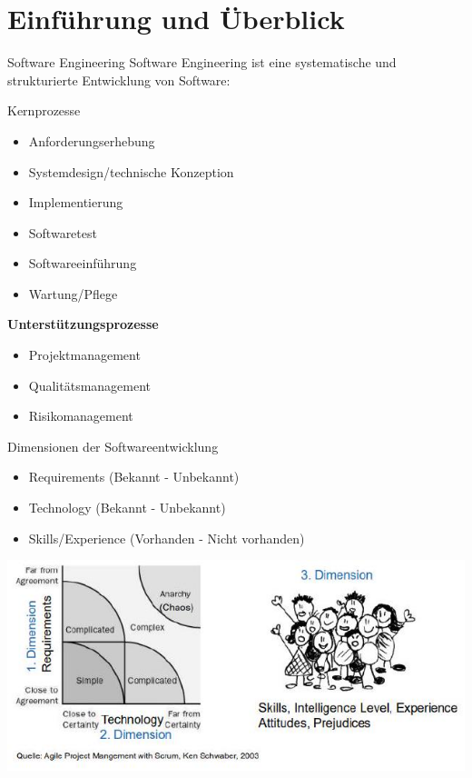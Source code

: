 \section{Einführung und Überblick}

\begin{definition}{Software Engineering}
Software Engineering ist eine systematische und strukturierte Entwicklung von Software:
\end{definition}

\begin{corollary}{Kernprozesse}

\begin{minipage}[t]{0.6\textwidth}
\begin{itemize}
  \item Anforderungserhebung
  \item Systemdesign/technische Konzeption
  \item Implementierung
  \item Softwaretest
  \item Softwareeinführung
  \item Wartung/Pflege
\end{itemize}
\end{minipage}
\begin{minipage}[t]{0.38\textwidth}
\textbf{\textcolor{frog}{Unterstützungsprozesse}}
\begin{itemize}
  \item Projektmanagement
  \item Qualitätsmanagement
  \item Risikomanagement
\end{itemize}
\end{minipage}
\end{corollary}


\begin{concept}{Dimensionen der Softwareentwicklung}
\begin{itemize}
    \item Requirements (Bekannt - Unbekannt)
    \item Technology (Bekannt - Unbekannt)  
    \item Skills/Experience (Vorhanden - Nicht vorhanden)
\end{itemize}
\includegraphics[width=\linewidth]{images/2024_12_29_0d1d7b5551ea1b4b41bdg-01}
\end{concept}

